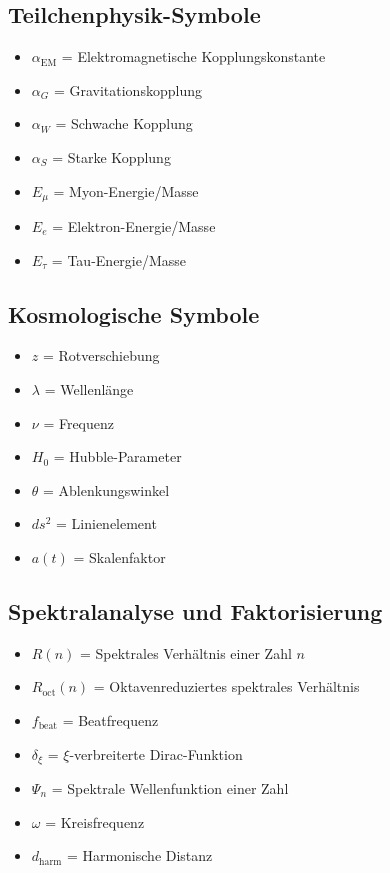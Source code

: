 \documentclass[12pt,a4paper]{article}
\begin{document}
	\subsection{Teilchenphysik-Symbole}
	\begin{itemize}
		\item $\alpha_{\text{EM}}$ = Elektromagnetische Kopplungskonstante
		\item $\alpha_G$ = Gravitationskopplung
		\item $\alpha_W$ = Schwache Kopplung
		\item $\alpha_S$ = Starke Kopplung
		\item $E_\mu$ = Myon-Energie/Masse
		\item $E_e$ = Elektron-Energie/Masse
		\item $E_\tau$ = Tau-Energie/Masse
	\end{itemize}
	
	\subsection{Kosmologische Symbole}
	\begin{itemize}
		\item $z$ = Rotverschiebung
		\item $\lambda$ = Wellenl\"{a}nge
		\item $\nu$ = Frequenz
		\item $H_0$ = Hubble-Parameter
		\item $\theta$ = Ablenkungswinkel
		\item $ds^2$ = Linienelement
		\item $a(t)$ = Skalenfaktor
	\end{itemize}
	
	\subsection{Spektralanalyse und Faktorisierung}
	\begin{itemize}
		\item $R(n)$ = Spektrales Verh\"{a}ltnis einer Zahl $n$
		\item $R_{\text{oct}}(n)$ = Oktavenreduziertes spektrales Verh\"{a}ltnis
		\item $f_{\text{beat}}$ = Beatfrequenz
		\item $\delta_\xi$ = $\xi$-verbreiterte Dirac-Funktion
		\item $\Psi_n$ = Spektrale Wellenfunktion einer Zahl
		\item $\omega$ = Kreisfrequenz
		\item $d_{\text{harm}}$ = Harmonische Distanz
	\end{itemize}
	
\end{document}
